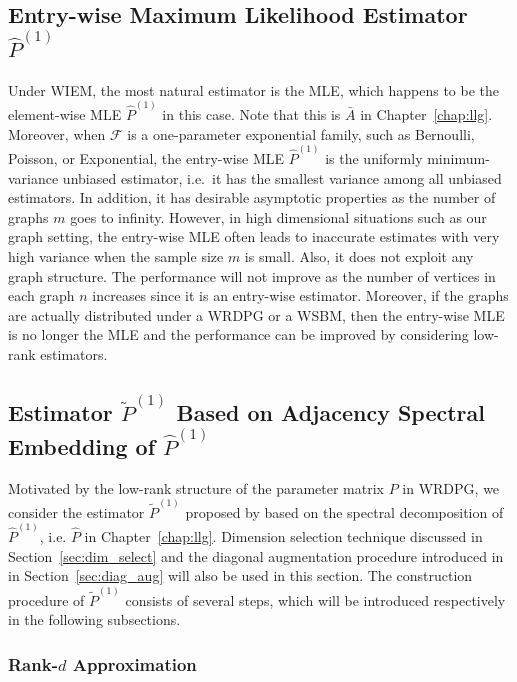 \subsection[Entry-wise Maximum Likelihood Estimator]{Entry-wise Maximum Likelihood Estimator $\hat{P}^{(1)}$}

Under WIEM, the most natural estimator is the MLE, which happens to be the element-wise MLE $\hat{P}^{(1)}$ in this case. Note that this is $\bar{A}$ in Chapter~\ref{chap:llg}.
Moreover, when $\mathcal{F}$ is a one-parameter exponential family, such as Bernoulli, Poisson, or Exponential, the entry-wise MLE $\hat{P}^{(1)}$ is the uniformly minimum-variance unbiased estimator, i.e.\ it has the smallest variance among all unbiased estimators. In addition, it has desirable asymptotic properties as the number of graphs $m$ goes to infinity.
However, in high dimensional situations such as our graph setting, the entry-wise MLE often leads to inaccurate estimates with very high variance when the sample size $m$ is small. Also, it does not exploit any graph structure. The performance will not improve as the number of vertices in each graph $n$ increases since it is an entry-wise estimator. Moreover, if the graphs are actually distributed under a WRDPG or a WSBM, then the entry-wise MLE is no longer the MLE  and the performance can be improved by considering low-rank estimators.


\subsection{Estimator $\widetilde{P}^{(1)}$ Based on Adjacency Spectral Embedding of $\hat{P}^{(1)}$}

Motivated by the low-rank structure of the parameter matrix $P$ in WRDPG, we consider the estimator $\widetilde{P}^{(1)}$ proposed by \citet{tang2016law} based on the spectral decomposition of $\hat{P}^{(1)}$, i.e. $\hat{P}$ in Chapter~\ref{chap:llg}.
Dimension selection technique discussed in Section~\ref{sec:dim_select} and the diagonal augmentation procedure introduced in in Section~\ref{sec:diag_aug} will also be used in this section. The construction procedure of $\widetilde{P}^{(1)}$ consists of several steps, which will be introduced respectively in the following subsections.

\subsubsection{Rank-$d$ Approximation}

